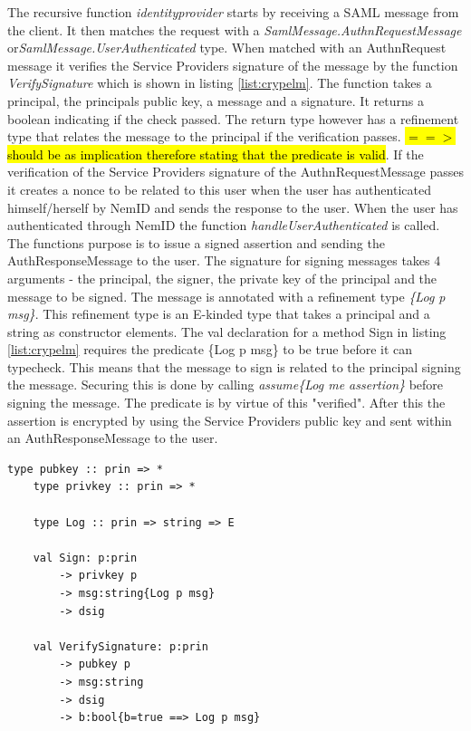 \documentclass[twosided]{report}
\begin{document}
The recursive function \emph{identityprovider} starts by receiving a SAML message from the client. It then matches the request with a \emph{SamlMessage.AuthnRequestMessage} or\emph{SamlMessage.UserAuthenticated} type. When matched with an AuthnRequest message it verifies the Service Providers signature of the message by the function \emph{VerifySignature} which is shown in listing \ref{list:crypelm}. The function takes a principal, the principals public key, a message and a signature. It returns a boolean indicating if the check passed. The return type however has a refinement type that relates the message to the principal if the verification passes. \hl{$==>$ should be as implication therefore stating that the predicate is valid}. If the verification of the Service Providers signature of the AuthnRequestMessage passes it creates a nonce to be related to this user when the user has authenticated himself/herself by NemID and sends the response to the user. When the user has authenticated through NemID the function \emph{handleUserAuthenticated} is called. The functions purpose is to issue a signed assertion and sending the AuthResponseMessage to the user. The signature for signing messages takes 4 arguments - the principal, the signer, the private key of the principal and the message to be signed. The message is annotated with a refinement type \emph{\{Log p msg\}}. This refinement type is an E-kinded type that takes a principal and a string as constructor elements. The val declaration for a method Sign in listing \ref{list:crypelm} requires the predicate \{Log p msg\} to be true before it can typecheck. This means that the message to sign is related to the principal signing the message. Securing this is done by calling \emph{assume\{Log me assertion\}} before signing the message. The predicate is by virtue of this "verified". After this the assertion is encrypted by using the Service Providers public key and sent within an AuthResponseMessage to the user.

\begin{lstlisting}[style=fstar, caption={Cryptographic elements}, label={list:crypelm}]
	type pubkey :: prin => *
	type privkey :: prin => *

	type Log :: prin => string => E
	
	val Sign: p:prin
		-> privkey p
		-> msg:string{Log p msg}
		-> dsig

	val VerifySignature: p:prin
		-> pubkey p 	
		-> msg:string
		-> dsig
		-> b:bool{b=true ==> Log p msg}
\end{lstlisting}
\end{document}
